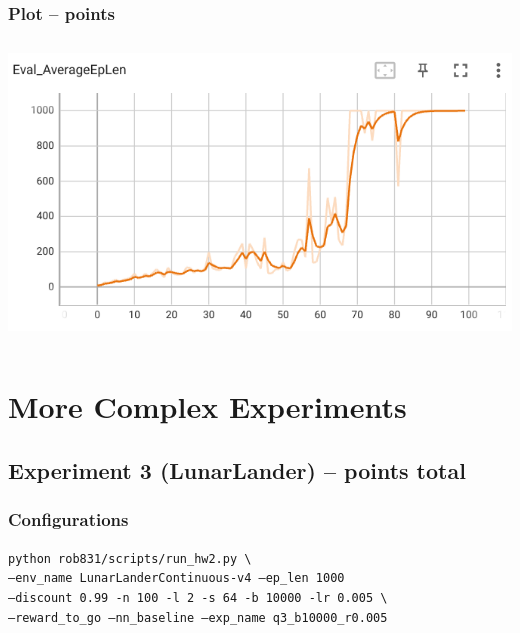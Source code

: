 \documentclass{article}
\begin{document}
\subsubsection{Plot --  points\rbrack}
\begin{answer}[title=Q5.2.3,height=10cm,width=\linewidth]
\centering
\includegraphics[height=8cm]{hw2/5.2.3.png}
\end{answer}

\setcounter{section}{6}
\section{More Complex Experiments}

\subsection{Experiment 3 (LunarLander) --  points total\rbrack}

\subsubsection{Configurations}
\begin{answer}[title=Q7.1.1,height=6cm,width=\linewidth]
\texttt{python rob831/scripts/run\_hw2.py \textbackslash}
\\
\texttt{\hspace{1cm}--env\_name LunarLanderContinuous-v4 --ep\_len 1000}
\\
\texttt{\hspace{1cm}--discount 0.99 -n 100 -l 2 -s 64 -b 10000 -lr 0.005 \textbackslash}
\\
\texttt{\hspace{1cm}--reward\_to\_go --nn\_baseline --exp\_name q3\_b10000\_r0.005}
\end{answer}
\end{document}

